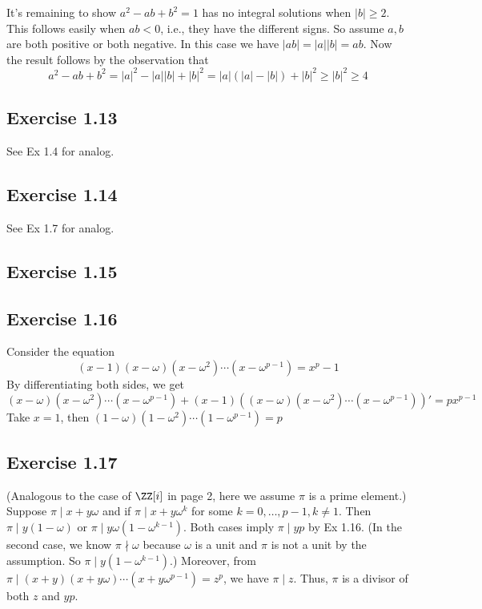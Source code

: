 \documentclass[../Chapter.tex]{subfiles}
\begin{document}
It's remaining to show $a^2-ab+b^2=1$ has no integral solutions when $|b|\geq 2$. This follows easily when $ab<0$, i.e., they have the different signs. So assume $a,b$ are both positive or both negative. In this case we have $|ab|=|a||b|=ab$. Now the result follows by the observation that $$a^2-ab+b^2=|a|^2-|a||b|+|b|^2=|a|(|a|-|b|)+|b|^2\geq |b|^2\geq 4$$

\subsection*{Exercise 1.13}

See Ex 1.4 for analog.

\subsection*{Exercise 1.14}

See Ex 1.7 for analog.

\subsection*{Exercise 1.15}

\subsection*{Exercise 1.16}

Consider the equation $$(x-1)(x-\omega)(x-\omega^2)\cdots(x-\omega^{p-1})=x^p-1$$ By differentiating both sides, we get $$(x-\omega)(x-\omega^2)\cdots(x-\omega^{p-1})+(x-1)\left ( (x-\omega)(x-\omega^2)\cdots(x-\omega^{p-1}) \right )'=px^{p-1}$$
Take $x=1$, then $(1-\omega)(1-\omega^2)\cdots(1-\omega^{p-1})=p$

\subsection*{Exercise 1.17}

(Analogous to the case of $\ZZ[i]$ in page 2, here we assume $\pi$ is a prime element.) Suppose $\pi\mid x+y\omega$ and if $\pi\mid x+y\omega^k$ for some $k=0,\ldots,p-1,k\neq 1$. Then $\pi\mid y(1-\omega)$ or $\pi\mid y\omega(1-\omega^{k-1})$. Both cases imply $\pi\mid yp$ by Ex 1.16. (In the second case, we know $\pi\nmid \omega$ because $\omega$ is a unit and $\pi$ is not a unit by the assumption. So $\pi\mid y(1-\omega^{k-1})$.) Moreover, from $\pi\mid (x+y)(x+y\omega)\cdots(x+y\omega^{p-1})=z^p$, we have $\pi\mid z$. Thus, $\pi$ is a divisor of both $z$ and $yp$.
\end{document}

